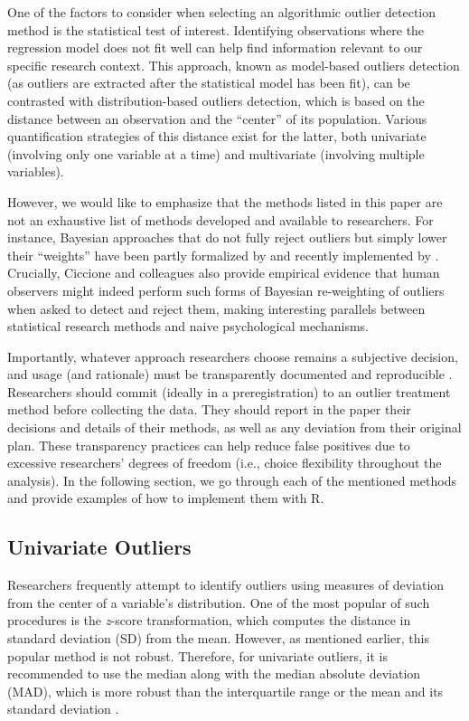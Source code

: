 \documentclass[sn-basic, lineno,pdflatex]{sn-jnl}
\begin{document}
One of the factors to consider when selecting an algorithmic outlier
detection method is the statistical test of interest. Identifying
observations where the regression model does not fit well can help find
information relevant to our specific research context. This approach,
known as model-based outliers detection (as outliers are extracted after
the statistical model has been fit), can be contrasted with
distribution-based outliers detection, which is based on the distance
between an observation and the ``center'' of its population. Various
quantification strategies of this distance exist for the latter, both
univariate (involving only one variable at a time) and multivariate
(involving multiple variables).

However, we would like to emphasize that the methods listed in this
paper are not an exhaustive list of methods developed and available to
researchers. For instance, Bayesian approaches that do not fully reject
outliers but simply lower their ``weights'' have been partly formalized
by \citet{chaloner1988bayesian} and recently implemented by
\citet{ciccione2023outlier}. Crucially, Ciccione and colleagues also
provide empirical evidence that human observers might indeed perform
such forms of Bayesian re-weighting of outliers when asked to detect and
reject them, making interesting parallels between statistical research
methods and naive psychological mechanisms.

Importantly, whatever approach researchers choose remains a subjective
decision, and usage (and rationale) must be transparently documented and
reproducible \citep{leys2019outliers}. Researchers should commit
(ideally in a preregistration) to an outlier treatment method before
collecting the data. They should report in the paper their decisions and
details of their methods, as well as any deviation from their original
plan. These transparency practices can help reduce false positives due
to excessive researchers' degrees of freedom (i.e., choice flexibility
throughout the analysis). In the following section, we go through each
of the mentioned methods and provide examples of how to implement them
with R.

\subsection{Univariate Outliers}\label{univariate-outliers}

Researchers frequently attempt to identify outliers using measures of
deviation from the center of a variable's distribution. One of the most
popular of such procedures is the \emph{z}-score transformation, which
computes the distance in standard deviation (SD) from the mean. However,
as mentioned earlier, this popular method is not robust. Therefore, for
univariate outliers, it is recommended to use the median along with the
median absolute deviation (MAD), which is more robust than the
interquartile range or the mean and its standard deviation
\citep{leys2019outliers, leys2013outliers}.
\end{document}
